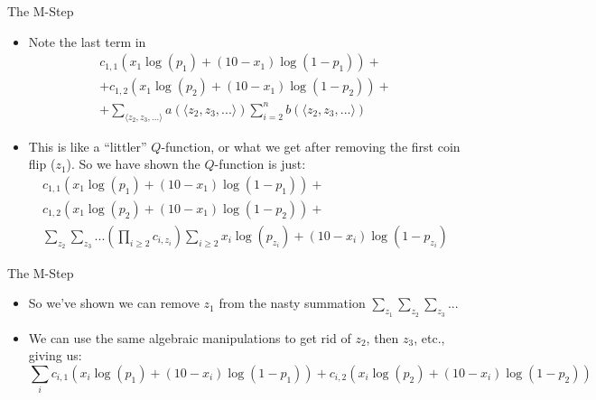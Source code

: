 \documentclass[aspectratio=169]{beamer}
\begin{document}
\begin{frame}{The M-Step}
	\begin{itemize}
	\item Note the last term in
		\begin{align}
		c_{1, 1} \left(x_1\log (p_1) + (10 - x_1) \log (1 - p_1) \right) + \nonumber \\ 
		+ c_{1, 2} \left(x_1\log (p_2) + (10 - x_1) \log (1 - p_2) \right) + \nonumber \\
		+ \sum_{\langle z_2, z_3, ... \rangle} a(\langle z_2, z_3, ... \rangle) \sum_{i = 2}^n b (\langle z_2, z_3, ... \rangle) \nonumber
		\end{align}
	\item This is like a ``littler'' $Q$-function, or what we get after removing the first coin flip ($z_1$). So we have shown the $Q$-function is just:
		\begin{align}
		c_{1, 1} \left(x_1\log (p_1) + (10 - x_1) \log (1 - p_1) \right) + \nonumber \\
		c_{1, 2} \left(x_1\log (p_2) + (10 - x_1) \log (1 - p_2) \right) + \nonumber \\
		\sum_{z_2 } \sum_{z_3}... \left( \prod_{i \geq 2} c_{i, z_i} \right) \sum_{i \geq 2} x_i \log (p_{z_i}) + (10 - x_i) \log (1 - p_{z_i}) \nonumber
		\end{align}
	\end{itemize}
\end{frame}
\begin{frame}{The M-Step}
        \begin{itemize}
	\item So we've shown we can remove $z_1$ from the nasty summation $\sum_{z_1} \sum_{z_2 } \sum_{z_3}...$
	\item We can use the same algebraic manipulations to get rid of $z_2$, then $z_3$, etc., giving us:
		$$\sum_i c_{i, 1} \left(x_i\log (p_1) + (10 - x_i) \log (1 - p_1) \right) 
			+ c_{i, 2} \left(x_i\log (p_2) + (10 - x_i) \log (1 - p_2) \right)$$
	\end{itemize}
\end{frame}
\end{document}
